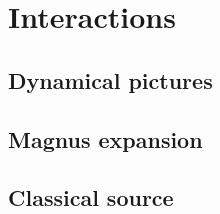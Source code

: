 \section{Interactions}

\subsection{Dynamical pictures}

\subsection{Magnus expansion}

\subsection{Classical source}
